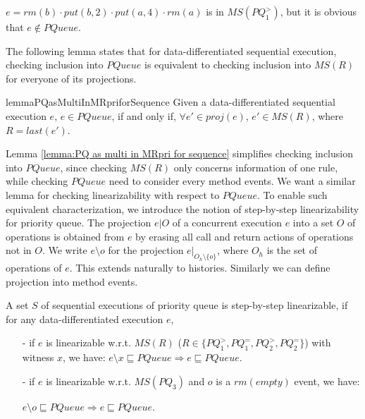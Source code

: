 \begin{example}\label{example:match set of R}
$e = \textit{rm}(b) \cdot \textit{put}(b,2) \cdot \textit{put}(a,4) \cdot \textit{rm}(a)$ is in $\textit{MS}(\textit{PQ}_1^{>} )$, but it is obvious that $e \notin \textit{PQueue}$.
\end{example}

The following lemma states that for data-differentiated sequential execution, checking inclusion into $\textit{PQueue}$ is equivalent to checking inclusion into $\textit{MS}(R)$ for everyone of its projections.

\begin{restatable}{lemma}{PQasMultiInMRpriforSequence}
\label{lemma:PQ as multi in MRpri for sequence}
Given a data-differentiated sequential execution $e$, $e \in \textit{PQueue}$, if and only if, $\forall e' \in \textit{proj}(e)$, $e' \in \textit{MS}(R)$, where $R = \textit{last}(e')$.
\end{restatable}

Lemma \ref{lemma:PQ as multi in MRpri for sequence} simplifies checking inclusion into $\textit{PQueue}$, since checking $\textit{MS}(R)$ only concerns information of one rule, while checking $\textit{PQueue}$ need to consider every method events. We want a similar lemma for checking linearizability with respect to $\textit{PQueue}$. To enable such equivalent characterization, we introduce the notion of step-by-step linearizability for priority queue. The projection $e \vert{O}$ of a concurrent execution $e$ into a set $O$ of operations is obtained from $e$ by erasing all call and return actions of operations not in $O$.  We write $e \setminus o$ for the projection $e \vert_{ O_h \setminus \{ o \} }$, where $O_h$ is the set of operations of $e$. This extends naturally to histories. Similarly we can define projection into method events.

\begin{definition}\label{def:step-by-step linearizability of priority queue}
A set $S$ of sequential executions of priority queue is step-by-step linearizable, if for any data-differentiated execution $e$,
\begin{itemize}
\setlength{\itemsep}{0.5pt}
\item[-] if $e$ is linearizable w.r.t. $\textit{MS}(R)$ ($R \in \{ \textit{PQ}_1^{>}, \textit{PQ}_1^{=}, \textit{PQ}_2^{>},\textit{PQ}_2^{=} \}$) with witness $x$, we have: $e \setminus x \sqsubseteq \textit{PQueue} \Rightarrow e \sqsubseteq \textit{PQueue}$.

\item[-] if $e$ is linearizable w.r.t. $\textit{MS}(\textit{PQ}_3)$ and $o$ is a $\textit{rm}(\textit{empty})$ event, we have:

$e \setminus o \sqsubseteq \textit{PQueue} \Rightarrow e \sqsubseteq \textit{PQueue}$.
\end{itemize}
\end{definition}

